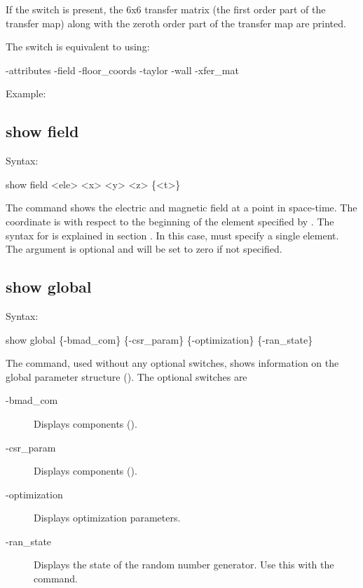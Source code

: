 {{{{{If the  switch is present, the 6x6 transfer matrix (the first order part of
the transfer map) along with the zeroth order part of the transfer map are printed.

The  switch is equivalent to using:
\begin{example}
  -attributes
  -field
  -floor_coords
  -taylor
  -wall
  -xfer_mat
\end{example}

Example:


\subsection{show field}
\label{s:show.field}

Syntax:
\begin{example}
  show field <ele> <x> <y> <z> \{<t>\}
\end{example}

The  command shows the electric and magnetic field at a point in
space-time. The  coordinate is with respect to the beginning of the element
specified by . The syntax for  is explained in section
. In this case,  must specify a single element.
The  argument is optional and will be set to zero if not specified.


\subsection{show global}
\label{s:show.global}

Syntax:
\begin{example}
  show global \{-bmad_com\} \{-csr_param\} \{-optimization\} \{-ran_state\} 
\end{example}


The  command, used without any optional switches,
shows information on the global parameter structure
(). The optional switches are
  \begin{description}
  \item[-bmad_com] \Newline
Displays  components ().
  \item[-csr_param] \Newline
Displays  components ().
  \item[-optimization] \Newline
Displays optimization parameters.
  \item[-ran_state] \Newline
Displays the state of the random number generator. Use this with the
 command.
  \end{description}

}}}}}

